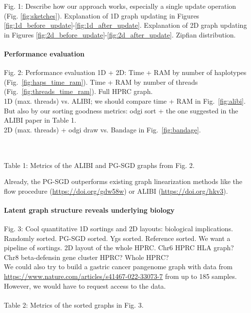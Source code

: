 \documentclass[11pt,hidelinks]{article}
\begin{document}
Fig. 1: Describe how our approach works, especially a single update operation (Fig. \ref{fig:sketches}). Explanation of 1D graph updating in Figures \ref{fig:1d_before_update}-\ref{fig:1d_after_update}. Explanation of 2D graph updating in Figures \ref{fig:2d_before_update}-\ref{fig:2d_after_update}. Zipfian distribution.



\paragraph{Performance evaluation}
Fig. 2: Performance evaluation 1D + 2D: Time + RAM by number of haplotypes (Fig.~\ref{fig:haps_time_ram}). Time + RAM by number of threads (Fig.~\ref{fig:threads_time_ram}). Full HPRC graph.
\\
1D (max. threads) vs. ALIBI; we should compare time + RAM in Fig.~\ref{fig:alibi}.
But also by our sorting goodness metrics: odgi sort + the one suggested in the ALIBI paper in Table 1.
\\
2D (max. threads) + odgi draw vs. Bandage in Fig.~\ref{fig:bandage}.

\\
\\
Table 1: Metrics of the ALIBI and PG-SGD graphs from Fig. 2.

Already, the PG-SGD outperforms existing graph linearization methods like the flow procedure (\url{https://doi.org/gdw58w}) or ALIBI (\url{https://doi.org/hkv3}).
\paragraph{Latent graph structure reveals underlying biology}
Fig. 3: Cool quantitative 1D sortings and 2D layouts: biological implications.
Randomly sorted. PG-SGD sorted. Ygs sorted. Reference sorted.
We want a pipeline of sortings. 2D layout of the whole HPRC.
Chr6 HPRC HLA graph? Chr8 beta-defensin gene cluster HPRC? Whole HPRC?
\\
We could also try to build a gastric cancer pangenome graph with data from \url{https://www.nature.com/articles/s41467-022-33073-7} from up to 185 samples.
However, we would have to request access to the data.
\\
\\

Table 2: Metrics of the sorted graphs in Fig. 3.

\end{document}
